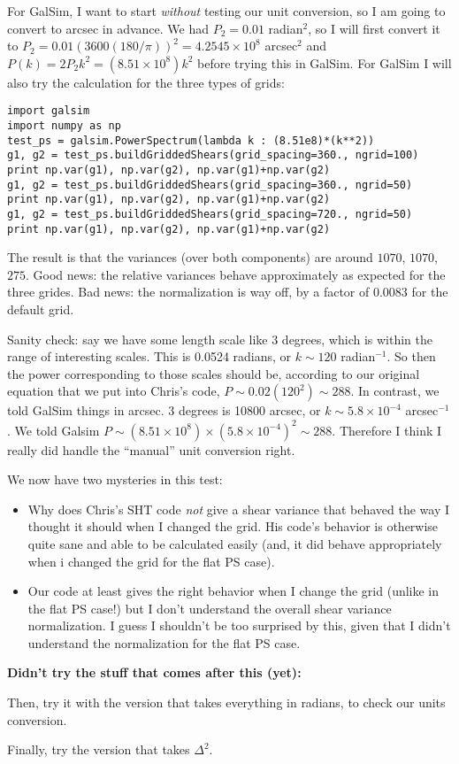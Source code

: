 \documentclass[preprint]{aastex}
\begin{document}
For GalSim, I want to start {\em without} testing our unit conversion,
so I am going to convert to arcsec in advance.  We had $P_2=0.01$
radian$^2$, so I will first convert it to
$P_2=0.01 (3600(180/\pi))^2=4.2545\times 10^8$ arcsec$^2$ and $P(k)=2
P_2 k^2 = (8.51\times 10^{8}) k^2$ before trying this in
GalSim.  For GalSim I will also try the calculation for the three
types of grids:
\begin{verbatim}
import galsim
import numpy as np
test_ps = galsim.PowerSpectrum(lambda k : (8.51e8)*(k**2))
g1, g2 = test_ps.buildGriddedShears(grid_spacing=360., ngrid=100)
print np.var(g1), np.var(g2), np.var(g1)+np.var(g2)
g1, g2 = test_ps.buildGriddedShears(grid_spacing=360., ngrid=50)
print np.var(g1), np.var(g2), np.var(g1)+np.var(g2)
g1, g2 = test_ps.buildGriddedShears(grid_spacing=720., ngrid=50)
print np.var(g1), np.var(g2), np.var(g1)+np.var(g2)
\end{verbatim}
The result is that the variances (over both components) are around
$1070$, $1070$, $275$.  Good news: the relative variances behave
approximately as expected for the three grides.  Bad news: the
normalization is way off, by a factor of $0.0083$ for the default grid.

Sanity check: say we have some length scale like 3 degrees, which is
within the range of interesting scales.  This is 0.0524 radians, or
$k\sim120$ radian$^{-1}$.  So
then the power corresponding to those scales should be, according to
our original equation that we put into Chris's code, $P\sim
0.02(120^2)\sim 288$.  In contrast, we told GalSim things in arcsec.
3 degrees is 10800 arcsec, or $k\sim 5.8\times 10^{-4}$ arcsec$^{-1}$.
We told Galsim $P\sim (8.51\times 10^8)\times (5.8\times
10^{-4})^2\sim 288$.  Therefore I think I really did handle the
``manual'' unit conversion right.

We now have two mysteries in this test:
\begin{itemize}
\item Why does Chris's SHT code {\em not} give a shear variance that
  behaved the way I thought it should when I changed the grid.  His
  code's behavior is otherwise quite sane and able to be calculated
  easily (and, it did behave appropriately when i changed the grid for
  the flat PS case).
\item Our code at least gives the right behavior when I change the
  grid (unlike in the flat PS case!) but I don't understand the
  overall shear variance normalization.  I guess I shouldn't be too
  surprised by this, given that I didn't understand the normalization
  for the flat PS case.
\end{itemize}

\textbf{Didn't try the stuff that comes after this (yet):}

Then, try it with the version that takes everything in radians, to
check our units conversion.

Finally, try the version that takes $\Delta^2$.
\end{document}
